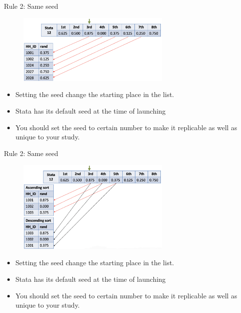 \documentclass[aspectratio=169]{beamer}
\begin{document}
\begin{frame}[fragile]{Rule 2: Same seed}

\begin{figure}
	\centering
	\includegraphics[width=75mm]{img/Randomization6}
\end{figure}

\begin{itemize}[<default overlay specification>]	
	\item<1>  Setting the seed change the starting place in the list.
	\item<1>  Stata has its default seed at the time of launching
	\item<1>  You should set the seed to certain number to make it replicable as well as unique to your study.
\end{itemize}

\end{frame}


\begin{frame}[fragile]{Rule 2: Same seed}

\begin{figure}
	\centering
	\includegraphics[width=75mm]{img/Randomization7}
\end{figure}

\begin{itemize}[<default overlay specification>]	
	\item<1>  Setting the seed change the starting place in the list.
	\item<1>  Stata has its default seed at the time of launching
	\item<1>  You should set the seed to certain number to make it replicable as well as unique to your study.
\end{itemize}

\end{frame}
\end{document}
